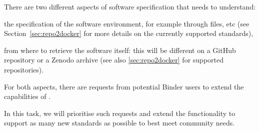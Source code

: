 \begin{task}[
  title=Support more software specification standards,
  id=buildpacks,
  lead=SRL,
  PM=12,
  partners={MP}
  ]

  There are two different aspects of software specification that \repotodocker{}
  needs to understand:
  \begin{compactitem}
  \item the specification of the software environment, for example through
     files, etc (see
    Section~\ref{sec:repo2docker}
    for more details on the currently
    supported standards),
  \item from where to retrieve the software itself: this will be different on a
    GitHub repository or a Zenodo archive
    (see also \ref{sec:repo2docker} for supported repositories).
  \end{compactitem}

  For both aspects, there are requests from potential Binder users to extend the
  capabilities of \repotodocker{}.

  In this task, we will prioritise such requests and extend the \repotodocker{}
  functionality to support as many new standards as possible to best meet community needs.

\end{task}
